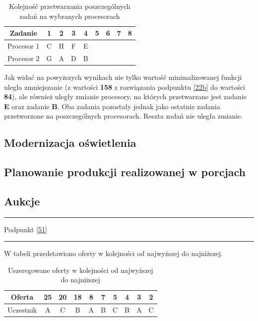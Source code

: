 \documentclass[
    12pt, %
]{../fphw}
\begin{document}
\begin{table}[H]
    \centering
    \begin{tabular}{| c | c | c | c | c | c | c | c | c |}
        \hline
        Zadanie    & 1 & 2 & 3 & 4 & 5 & 6 & 7 & 8 \\
        \hline
        Procesor 1 & C & H & F & E &   &   &   &   \\
        \hline
        Procesor 2 & G & A & D & B &   &   &   &   \\
        \hline
    \end{tabular}
    \caption{Kolejność przetwarzania poszczególnych zadań na wybranych procesorach}
\end{table}

Jak widać na powyższych wynikach nie tylko wartość minimalizowanej funkcji uległa zmniejszanie
(z wartości \textbf{158} z rozwiązania podpunktu \ref{22b} do wartości \textbf{84}),
ale również uległy zmianie procesory, na których przetwarzane jest zadanie \textbf{E}
oraz zadanie \textbf{B}. Oba zadania pozostały jednak jako ostatnie zadania przetworzone 
na poszczególnych procesorach. Reszta zadań nie uległa zmianie.

\newpage

\subsection{Modernizacja oświetlenia}
\subsection{Planowanie produkcji realizowanej w porcjach}
\subsection{Aukcje}

\par\noindent\rule{\textwidth}{0.4pt}
Podpunkt \ref{51}
\par\noindent\rule{\textwidth}{0.4pt}

W tabeli przedstawiono oferty w kolejności od najwyższej do najniższej.
\begin{table}[H]
    \centering
    \begin{tabular}{ | c | c | c | c | c | c | c | c | c | c |}
        \hline
        Oferta    & 25 & 20 & 18 & 8 & 7 & 5 & 4 & 3 & 2 \\
        \hline
        Uczestnik & A  & C  & B  & A & B & C & B & A & C \\
        \hline
    \end{tabular}
    \caption{Uszeregowane oferty w kolejności od najwyższej do najniższej}
\end{table}
\end{document}
